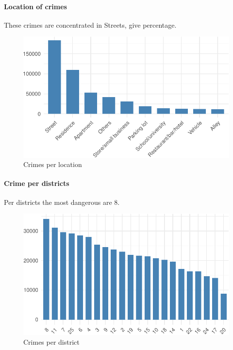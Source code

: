 \documentclass[]{article}
\let\oldparagraph\paragraph
\renewcommand{\paragraph}[1]{\oldparagraph{#1}\mbox{}}
\begin{document}
\paragraph{Location of crimes}\label{location-of-crimes}

These crimes are concentrated in Streets, give percentage.

\begin{figure}[H]

{\centering \includegraphics{Assessment_1v11_files/figure-latex/fig7-1} 

}

\caption{Crimes per location}\label{fig:fig7}
\end{figure}

\paragraph{Crime per districts}\label{crime-per-districts}

Per districts the most dangerous are 8.

\begin{figure}[H]

{\centering \includegraphics{Assessment_1v11_files/figure-latex/fig8-1} 

}

\caption{Crimes per district}\label{fig:fig8}
\end{figure}
\end{document}
